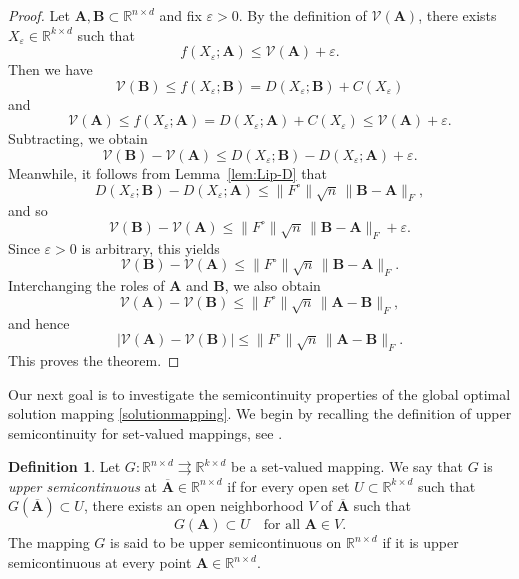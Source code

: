 \documentclass[11pt]{article}
\theoremstyle{definition}
\newtheorem{definition}[theorem]{Definition}
\newcommand{\R}{\mathbb{R}}
\newcommand{\1}{\mathbf{1}}
\def\Bar{\overline}
\begin{document}
\begin{proof}
Let $\mathbf{A},\mathbf{B}\subset\R^{n\times d}$ and fix $\varepsilon>0$. By the definition of $\mathcal{V}(\mathbf{A})$,
there exists $X_\varepsilon\in\R^{k\times d}$ such that
\[
f(X_\varepsilon;\mathbf{A})\le \mathcal{V}(\mathbf{A})+\varepsilon.
\]
Then we have
\[
\mathcal{V}(\mathbf{B})
\le
f(X_\varepsilon;\mathbf{B})=D(X_\varepsilon;\mathbf{B})+C(X_\varepsilon)\]
and
\[\mathcal{V}(\mathbf{A})\le f(X_\varepsilon;\mathbf{A})=D(X_\varepsilon;\mathbf{A})+C(X_\varepsilon)\le \mathcal{V}(\mathbf{A})+\varepsilon.\]
Subtracting, we obtain
\[\mathcal{V}(\mathbf{B})-\mathcal{V}(\mathbf{A})\le D(X_\varepsilon;\mathbf{B})-D(X_\varepsilon;\mathbf{A})+\varepsilon.\]
Meanwhile,  it follows from Lemma~\ref{lem:Lip-D} that
\[D(X_\varepsilon;\mathbf{B})-D(X_\varepsilon;\mathbf{A})\le\|F^\circ\|\sqrt{n}\,\|\mathbf{B}-\mathbf{A}\|_F,
\]
and so
\[
\mathcal{V}(\mathbf{B})-\mathcal{V}(\mathbf{A})\le
\|F^\circ\|\sqrt{n}\,\|\mathbf{B}-\mathbf{A}\|_F+\varepsilon.
\]
Since $\varepsilon>0$ is arbitrary, this yields
\[\mathcal{V}(\mathbf{B})-\mathcal{V}(\mathbf{A})\le
\|F^\circ\|\sqrt{n}\,\|\mathbf{B}-\mathbf{A}\|_F.
\]
Interchanging the roles of $\mathbf{A}$ and $\mathbf{B}$, we also obtain
\[
\mathcal{V}(\mathbf{A})-\mathcal{V}(\mathbf{B})
\le\|F^\circ\|\sqrt{n}\,\|\mathbf{A}-\mathbf{B}\|_F,\]
and hence
\[|\mathcal{V}(\mathbf{A})-\mathcal{V}(\mathbf{B})|\le
\|F^\circ\|\sqrt{n}\,\|\mathbf{A}-\mathbf{B}\|_F.\]
This proves the theorem.
\end{proof}


Our next goal is to investigate the semicontinuity properties of the global optimal solution mapping \eqref{solutionmapping}. 
 We begin by recalling the definition of upper semicontinuity for set-valued mappings, see \cite[p. 109]{Berge}.


\begin{definition}\label{def:usc-neighborhood}
Let $G: \mathbb{R}^{n \times d} \rightrightarrows \mathbb{R}^{k \times d}$ be a set-valued mapping. We say that $G$ is \emph{upper semicontinuous} at $\mathbf{\Bar{A}} \in \mathbb{R}^{n \times d}$ if for every open set $U \subset \mathbb{R}^{k \times d}$ such that $G(\mathbf{\Bar{A}}) \subset U$, there exists an open neighborhood $V$ of $\mathbf{\Bar{A}}$ such that 
\[
G(\mathbf{A}) \subset U \quad \text{for all } \mathbf{A} \in V.
\]
The mapping $G$ is said to be upper semicontinuous on $\mathbb{R}^{n \times d}$ if it is upper semicontinuous at every point $\mathbf{A} \in \mathbb{R}^{n \times d}$.
\end{definition}
\end{document}
